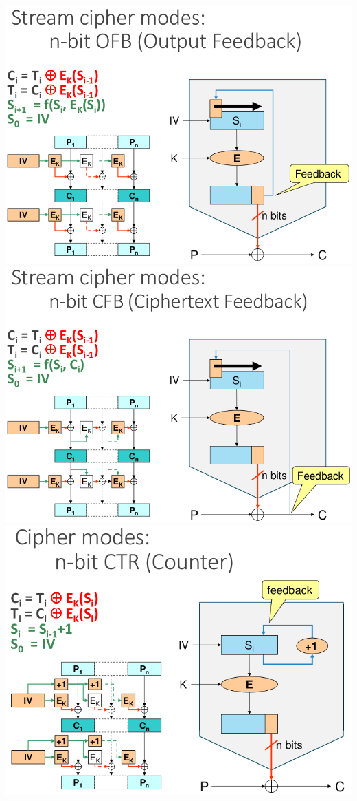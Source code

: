 \documentclass{article}
\begin{document}
\begin{center}
  \includegraphics[scale=0.3]{87}
  \includegraphics[scale=0.3]{88}
  \includegraphics[scale=0.3]{89}

\end{center}
\end{document}
